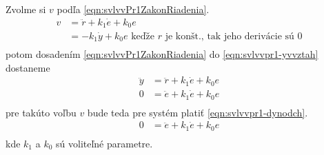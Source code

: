 \documentclass[../main.tex]{subfiles}
\begin{document}
    Zvolme si $v$ podľa \cref{eqn:svlvvPr1ZakonRiadenia}.
	\begin{equation}
	\begin{aligned}
	 v &= \ddot{r}  +k_1 \dot{e} + k_0 e \\
	   &= -k_1 \dot{y} + k_0 e \text{ keďže $r$ je konšt., tak jeho derivácie sú 0}\\
	   \end{aligned}
	\label{eqn:svlvvPr1ZakonRiadenia}
	\end{equation}
    potom dosadením \cref{eqn:svlvvPr1ZakonRiadenia} do \cref{eqn:svlvvpr1-yvvztah} dostaneme 
	\begin{equation*}
	\begin{aligned}
	 \ddot{y} &= \ddot{r}  +k_1 \dot{e} + k_0 e \\
	 0 &= \ddot{e}  + k_1 \dot{e} + k_0 e \\
	\end{aligned}
	\end{equation*}
    pre takúto voľbu $v$ bude teda pre systém platiť \cref{eqn:svlvvpr1-dynodch}.
    \begin{equation}
        \begin{aligned}
	        0 &= \ddot{e}  + k_1 \dot{e} + k_0 e \\
        \end{aligned}
        \label{eqn:svlvvpr1-dynodch}
    \end{equation} 
    kde $k_1$ a $k_0$ sú voliteľné parametre. 
\end{document}
